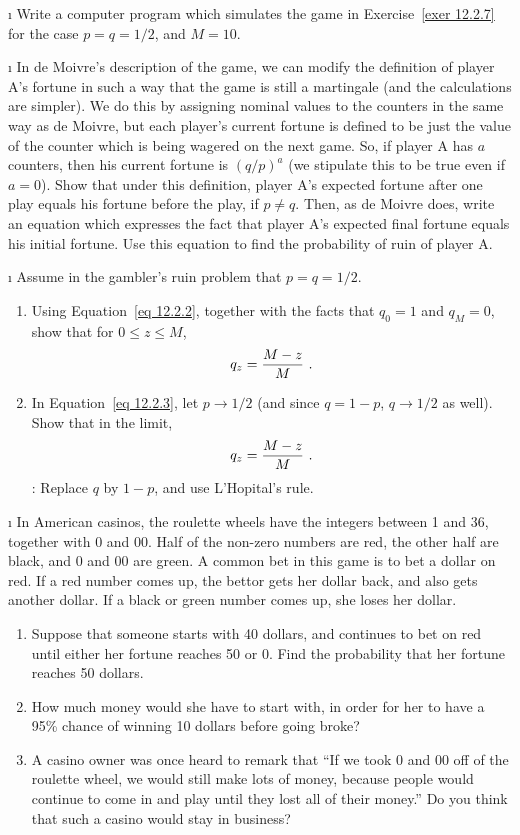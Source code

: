 \begin{LJSItem}
\i\label{exer 12.2.9} Write a computer program which simulates the game in Exercise~\ref{exer 12.2.7}
for the case $p = q = 1/2$, and $M = 10$.  

\i\label{exer 12.2.10} In de Moivre's description of the game, we can modify the definition of
player A's fortune in such a way that the game is still a martingale (and the calculations are
simpler).  We do this by assigning nominal values to the counters in the same way as de Moivre,
but each player's current fortune is defined to be just the value of the counter which is being
wagered on the next game.  So, if player A has $a$ counters, then his current fortune is
$(q/p)^a$ (we stipulate this to be true even if $a = 0$).  Show that under this definition,
player A's expected fortune after one play equals his fortune before the play, if $p \ne q$. 
Then, as de Moivre does, write an equation which expresses the fact that player A's expected
final fortune equals his initial fortune.  Use this equation to find the probability of ruin of
player A.

\i\label{exer 12.2.11} Assume in the gambler's ruin problem that $p = q = 1/2$.
\begin{enumerate}
\item  Using Equation~\ref{eq 12.2.2}, together with the facts that $q_0 = 1$ and $q_M = 0$,
show that for $0 \le z \le M$,
$$q_z = {{M - z}\over M}\ .$$
\item  In Equation~\ref{eq 12.2.3}, let $p \rightarrow 1/2$ (and since $q = 1 - p$, $q
\rightarrow 1/2$ as well).  Show that in the limit,
$$q_z = {{M - z}\over M}\ .$$  :  Replace $q$ by $1-p$, and use L'Hopital's rule.
\end{enumerate}

\i\label{exer 12.2.12} In American casinos, the roulette wheels have the integers between 1 and
36, together with 0 and 00.  Half of the non-zero numbers are red, the other half are black, and
0 and 00 are green.  A common bet in this game is to bet a dollar on red.  If a red number
comes up, the bettor gets her dollar back, and also gets another dollar.  If a black or green
number comes up, she loses her dollar.
\begin{enumerate}
\item Suppose that someone starts with 40 dollars, and continues to bet on red until either her
fortune reaches 50 or 0.  Find the probability that her fortune reaches 50 dollars.
\item How much money would she have to start with, in order for her to have a 95\% chance of
winning 10 dollars before going broke?
\item A casino owner was once heard to remark that ``If we took 0 and 00 off of the roulette
wheel, we would still make lots of money, because people would continue to come in and play
until they lost all of their money.''  Do you think that such a casino would stay in business?
\end{enumerate}

\end{LJSItem}





